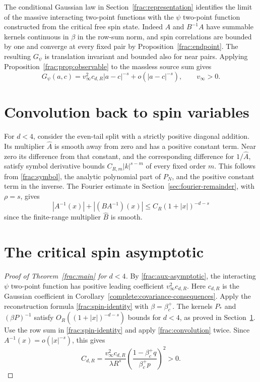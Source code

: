 \documentclass[11pt]{article}
\begin{document}
The conditional Gaussian law in Section~\ref{frac:representation}
identifies the limit of the massive interacting two-point functions
with the \(\psi\) two-point function constructed from the critical
free spin state. Indeed \(A\) and \(B^{-1}A\) have summable kernels
continuous in \(\beta\) in the row-sum norm, and spin correlations
are bounded by one and converge at every fixed pair by
Proposition~\ref{frac:endpoint}. The resulting \(G_\psi\) is
translation invariant and bounded also for near pairs. Applying
Proposition~\ref{frac:prop:observable} to the massless source sum gives
\begin{equation}\label{frac:aux-asymptotic}
 G_\psi(a,c)=v_\infty^2c_{d,R}|a-c|^{-s}
                    +o(|a-c|^{-s}),\qquad v_\infty>0.
\end{equation}

\section{Convolution back to spin variables}
\label{frac:inverse-kernels}

For \(d<4\), consider the even-tail split with a strictly
positive diagonal addition. Its multiplier \(\widehat A\) is
smooth away from zero and has a positive constant term. Near
zero its difference from that constant, and the corresponding
difference for \(1/\widehat A\), satisfy symbol derivative
bounds \(C_{R,m}|k|^{s-m}\) of every fixed order \(m\).
This follows from \eqref{frac:symbol}, the analytic polynomial
part of \(P_N\), and the positive constant term in the inverse.
The Fourier estimate in Section~\ref{sec:fourier-remainder}, with
\(\rho=s\), gives
\[
 |A^{-1}(x)|+|(BA^{-1})(x)|
     \le C_R(1+|x|)^{-d-s}
\]
since the finite-range multiplier \(\widehat B\) is smooth.


\section{The critical spin asymptotic}
\label{frac:reduction}
\begin{proof}[Proof of Theorem~\ref{frac:main} for \(d<4\)]
By \eqref{frac:aux-asymptotic}, the interacting \(\psi\) two-point
function has positive leading coefficient \(v_\infty^2c_{d,R}\).
Here \(c_{d,R}\) is the Gaussian coefficient in
Corollary~\ref{complete:covariance-consequences}.
Apply the reconstruction formula \eqref{frac:spin-identity}
with \(\beta=\beta_c^+\).
The kernels \(P_*\) and \((\beta P)^{-1}\) satisfy
\(O_R((1+|x|)^{-d-s})\) bounds for \(d<4\), as proved in
Section~\ref{frac:inverse-kernels}. Use the row sum in \eqref{frac:spin-identity} and apply
\eqref{frac:convolution} twice. Since \(A^{-1}(x)=o(|x|^{-s})\), this gives
\[
 C_{d,R}=\frac{v_\infty^2 c_{d,R}}{\lambda R^s}
       \left(\frac{1-\beta_c^+q}{\beta_c^+p}\right)^2>0.
\]
\end{proof}
\end{document}
